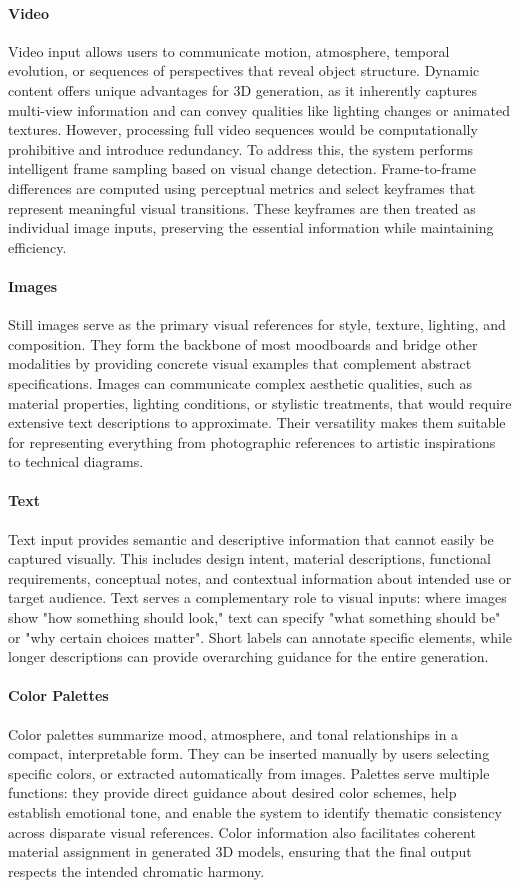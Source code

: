 \paragraph{Video} Video input allows users to communicate motion, atmosphere, temporal evolution, or sequences of perspectives that reveal object structure. Dynamic content offers unique advantages for 3D generation, as it inherently captures multi-view information and can convey qualities like lighting changes or animated textures. However, processing full video sequences would be computationally prohibitive and introduce redundancy. To address this, the system performs intelligent frame sampling based on visual change detection. Frame-to-frame differences are computed using perceptual metrics and select keyframes that represent meaningful visual transitions. These keyframes are then treated as individual image inputs, preserving the essential information while maintaining efficiency.

\paragraph{Images} Still images serve as the primary visual references for style, texture, lighting, and composition. They form the backbone of most moodboards and bridge other modalities by providing concrete visual examples that complement abstract specifications. Images can communicate complex aesthetic qualities, such as material properties, lighting conditions, or stylistic treatments, that would require extensive text descriptions to approximate. Their versatility makes them suitable for representing everything from photographic references to artistic inspirations to technical diagrams.

\paragraph{Text} Text input provides semantic and descriptive information that cannot easily be captured visually. This includes design intent, material descriptions, functional requirements, conceptual notes, and contextual information about intended use or target audience. Text serves a complementary role to visual inputs: where images show "how something should look," text can specify "what something should be" or "why certain choices matter". Short labels can annotate specific elements, while longer descriptions can provide overarching guidance for the entire generation.

\paragraph{Color Palettes} Color palettes summarize mood, atmosphere, and tonal relationships in a compact, interpretable form. They can be inserted manually by users selecting specific colors, or extracted automatically from images. Palettes serve multiple functions: they provide direct guidance about desired color schemes, help establish emotional tone, and enable the system to identify thematic consistency across disparate visual references. Color information also facilitates coherent material assignment in generated 3D models, ensuring that the final output respects the intended chromatic harmony.

